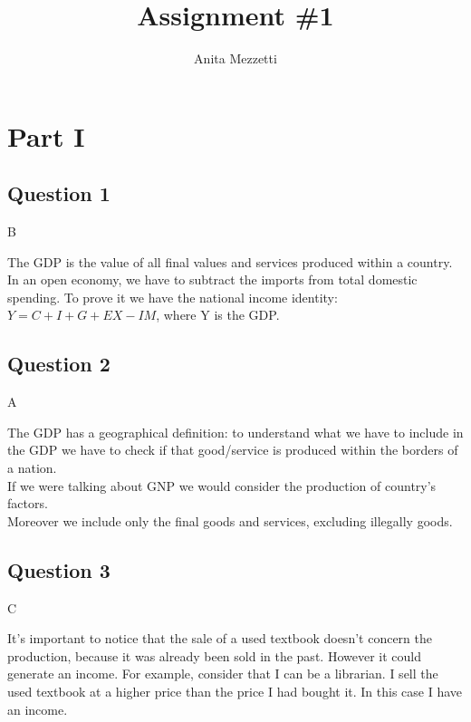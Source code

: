 \documentclass[
	12pt, %
]{fphw}
\title{Assignment \#1} %
\author{Anita Mezzetti}
\institute{École polytechnique fédérale de Lausanne}
\begin{document}
\maketitle 
\chapter{Part I}
\section*{Question 1}

B \\
\par The GDP is the value of all final values and services produced within a country. In an open economy, we have to subtract the imports from total domestic spending. To prove it we have the national income identity: $Y=C+I+G+EX-IM$, where Y is the GDP.


\section*{Question 2}
A \\
\par The GDP has a geographical definition: to understand what we have to include in the GDP we have to check if that good/service is produced within the borders of a nation. \\If we were talking about GNP we would consider the production of country's factors. \\
Moreover we include only the final goods and services, excluding illegally goods.

\section*{Question 3}
C \\
\par It's important to notice that the sale of a used textbook doesn't concern the production, because it was already been sold in the past. However it could generate an income. For example, consider that I can be a librarian. I sell the used textbook at a higher price than the price I had bought it. In this case I have an income. 

\end{document}
